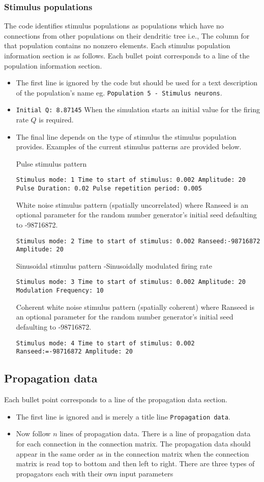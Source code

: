 \documentclass[12pt,a4paper]{article}
\begin{document}
\subsubsection{Stimulus populations}
The code identifies stimulus populations as populations which have no 
connections from other populations on their dendritic tree i.e.,
The column for that population contains no nonzero elements.
Each stimulus population information section is as follows. Each bullet point
corresponds to a line of the population information section.
\begin{itemize}
\item The first line is ignored by the code but should be used for
a text description of the population's name eg. 
{\tt \small Population 5 - Stimulus neurons}.
\item {\tt \small Initial Q: 8.87145} When the simulation starts an initial
value for the firing rate $Q$ is required.
\item The final line depends on the type of stimulus the stimulus population
provides. Examples of the current stimulus patterns are provided below.

Pulse stimulus pattern

{\tt \small Stimulus mode: 1 Time to start of stimulus: 0.002 Amplitude: 20
Pulse Duration: 0.02 Pulse repetition period: 0.005}

White noise stimulus pattern (spatially uncorrelated) where Ranseed
is an optional parameter for the random number generator's initial seed defaulting to -98716872.

{\tt \small Stimulus mode: 2 Time to start of stimulus: 0.002 Ranseed:-98716872 Amplitude: 20}

Sinusoidal stimulus pattern -Sinusoidally modulated firing rate

{\tt \small Stimulus mode: 3 Time to start of stimulus: 0.002 Amplitude: 20
Modulation Frequency: 10}

Coherent white noise stimulus pattern (spatially coherent) where Ranseed
is an optional parameter for the random number generator's initial seed defaulting to -98716872.

{\tt \small Stimulus mode: 4 Time to start of stimulus: 0.002 Ranseed:=-98716872 Amplitude: 20}
\end{itemize}

\subsection{Propagation data}
Each bullet point corresponds to a line of the propagation data section.
\begin{itemize}
\item The first line is ignored and is merely a title line {\tt \small Propagation data}.
\item Now follow $n$ lines of propagation data. There is a line of propagation
data for each connection in the connection matrix. The propagation data
should appear in the same order as in the connection matrix when the 
connection matrix is read top to bottom and then left to right. There are three types
of propagators each with their own input parameters
\end{itemize}
\end{document}
